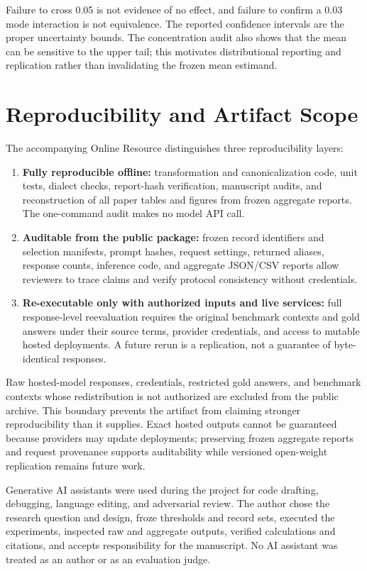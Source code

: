 \documentclass[11pt,a4paper]{article}
\begin{document}
Failure to cross 0.05 is not evidence of no effect, and failure to confirm a 0.03 mode interaction is not equivalence. The reported confidence intervals are the proper uncertainty bounds. The concentration audit also shows that the mean can be sensitive to the upper tail; this motivates distributional reporting and replication rather than invalidating the frozen mean estimand.

\section{Reproducibility and Artifact Scope}
The accompanying Online Resource distinguishes three reproducibility layers:

\begin{enumerate}
\item \textbf{Fully reproducible offline:} transformation and canonicalization code, unit tests, dialect checks, report-hash verification, manuscript audits, and reconstruction of all paper tables and figures from frozen aggregate reports. The one-command audit makes no model API call.
\item \textbf{Auditable from the public package:} frozen record identifiers and selection manifests, prompt hashes, request settings, returned aliases, response counts, inference code, and aggregate JSON/CSV reports allow reviewers to trace claims and verify protocol consistency without credentials.
\item \textbf{Re-executable only with authorized inputs and live services:} full response-level reevaluation requires the original benchmark contexts and gold answers under their source terms, provider credentials, and access to mutable hosted deployments. A future rerun is a replication, not a guarantee of byte-identical responses.
\end{enumerate}
Raw hosted-model responses, credentials, restricted gold answers, and benchmark contexts whose redistribution is not authorized are excluded from the public archive. This boundary prevents the artifact from claiming stronger reproducibility than it supplies. Exact hosted outputs cannot be guaranteed because providers may update deployments; preserving frozen aggregate reports and request provenance supports auditability while versioned open-weight replication remains future work.

Generative AI assistants were used during the project for code drafting, debugging, language editing, and adversarial review. The author chose the research question and design, froze thresholds and record sets, executed the experiments, inspected raw and aggregate outputs, verified calculations and citations, and accepts responsibility for the manuscript. No AI assistant was treated as an author or as an evaluation judge.
\end{document}
